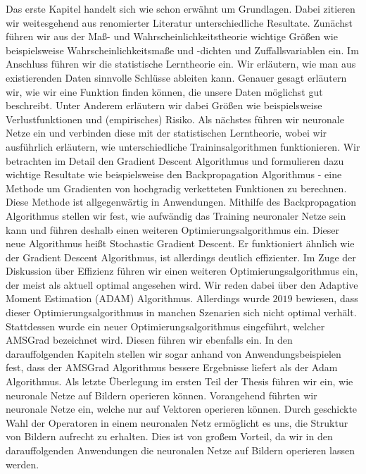 \documentclass[11pt, twoside, a4paper]{book}
\theoremstyle{plain}
\theoremstyle{definition}
\theoremstyle{plain}
\begin{document}
Das erste Kapitel handelt sich wie schon erwähnt um Grundlagen. Dabei zitieren wir weitesgehend aus renomierter Literatur unterschiedliche Resultate. Zunächst führen wir aus der Maß- und Wahrscheinlichkeitstheorie wichtige Größen wie beispielsweise Wahrscheinlichkeitsmaße und -dichten und Zuffallsvariablen ein.
Im Anschluss führen wir die statistische Lerntheorie ein. Wir erläutern, wie man aus existierenden Daten sinnvolle Schlüsse ableiten kann. Genauer gesagt erläutern wir, wie wir eine Funktion finden können, die unsere Daten möglichst gut beschreibt. Unter Anderem erläutern wir dabei Größen wie beispielsweise Verlustfunktionen und (empirisches) Risiko.
Als nächstes führen wir neuronale Netze ein und verbinden diese mit der statistischen Lerntheorie, wobei wir ausführlich erläutern, wie unterschiedliche Traininsalgorithmen funktionieren. Wir betrachten im Detail den \glqq Gradient Descent\grqq{} Algorithmus und formulieren dazu wichtige Resultate wie beispielsweise den \glqq Backpropagation\grqq{} Algorithmus - eine Methode um Gradienten von hochgradig verketteten Funktionen zu berechnen. Diese Methode ist allgegenwärtig in Anwendungen.
Mithilfe des Backpropagation Algorithmus stellen wir fest, wie aufwändig das Training neuronaler Netze sein kann und führen deshalb einen weiteren Optimierungsalgorithmus ein. Dieser neue Algorithmus heißt \glqq Stochastic Gradient Descent\grqq{}. Er funktioniert ähnlich wie der Gradient Descent Algorithmus, ist allerdings deutlich effizienter.
Im Zuge der Diskussion über Effizienz führen wir einen weiteren Optimierungsalgorithmus ein, der meist als aktuell optimal angesehen wird. Wir reden dabei über den \glqq Adaptive Moment Estimation\grqq{} (ADAM) Algorithmus. Allerdings wurde $2019$ bewiesen, dass dieser Optimierungsalgorithmus in manchen Szenarien sich nicht optimal verhält. Stattdessen wurde ein neuer Optimierungsalgorithmus eingeführt, welcher \glqq AMSGrad\grqq{} bezeichnet wird. Diesen führen wir ebenfalls ein. In den darauffolgenden Kapiteln stellen wir sogar anhand von Anwendungsbeispielen fest, dass der AMSGrad Algorithmus bessere Ergebnisse liefert als der Adam Algorithmus.
Als letzte Überlegung im ersten Teil der Thesis führen wir ein, wie neuronale Netze auf Bildern operieren können. Vorangehend führten wir neuronale Netze ein, welche nur auf Vektoren operieren können. Durch geschickte Wahl der Operatoren in einem neuronalen Netz ermöglicht es uns, die Struktur von Bildern aufrecht zu erhalten. Dies ist von großem Vorteil, da wir in den darauffolgenden Anwendungen die neuronalen Netze auf Bildern operieren lassen werden.
\end{document}
